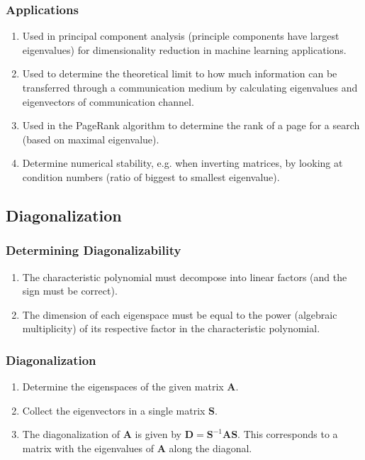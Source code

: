 \documentclass[10pt,twoside,twocolumn]{article}
\begin{document}
\subsubsection{Applications}
\begin{enumerate}
\item Used in principal component analysis (principle components have largest
eigenvalues) for dimensionality reduction in machine learning applications.
\item Used to determine the theoretical limit to how much information can
be transferred through a communication medium by calculating eigenvalues
and eigenvectors of communication channel.
\item Used in the PageRank algorithm to determine the rank of a page for
a search (based on maximal eigenvalue).
\item Determine numerical stability, e.g. when inverting matrices, by looking
at condition numbers (ratio of biggest to smallest eigenvalue).
\end{enumerate}

\subsection{Diagonalization}


\subsubsection{Determining Diagonalizability}
\begin{enumerate}
\item The characteristic polynomial must decompose into linear factors (and
the sign must be correct). 
\item The dimension of each eigenspace must be equal to the power (algebraic
multiplicity) of its respective factor in the characteristic polynomial. 
\end{enumerate}

\subsubsection{Diagonalization}
\begin{enumerate}
\item Determine the eigenspaces of the given matrix $\mathbf{A}$. 
\item Collect the eigenvectors in a single matrix $\mathbf{S}$. 
\item The diagonalization of $\mathbf{A}$ is given by $\mathbf{D}=\mathbf{S}^{-1}\mathbf{A}\mathbf{S}$.
This corresponds to a matrix with the eigenvalues of $\mathbf{A}$
along the diagonal.
\end{enumerate}
\end{document}
